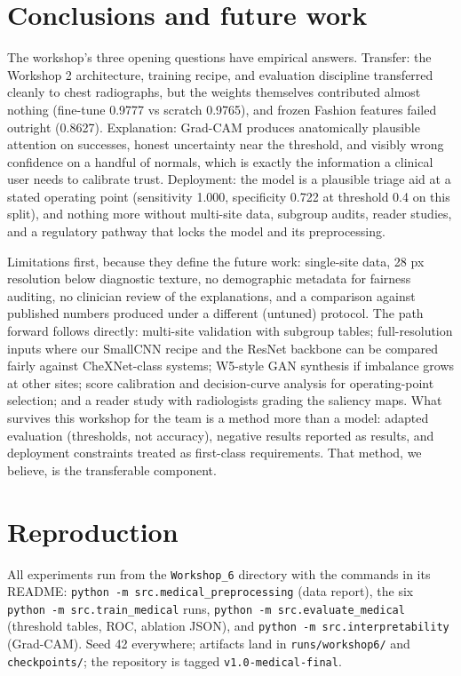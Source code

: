 \documentclass[11pt,a4paper]{article}
\begin{document}
\section{Conclusions and future work}

The workshop's three opening questions have empirical answers. Transfer: the Workshop 2 architecture, training recipe, and evaluation discipline transferred cleanly to chest radiographs, but the weights themselves contributed almost nothing (fine-tune 0.9777 vs scratch 0.9765), and frozen Fashion features failed outright (0.8627). Explanation: Grad-CAM produces anatomically plausible attention on successes, honest uncertainty near the threshold, and visibly wrong confidence on a handful of normals, which is exactly the information a clinical user needs to calibrate trust. Deployment: the model is a plausible triage aid at a stated operating point (sensitivity 1.000, specificity 0.722 at threshold 0.4 on this split), and nothing more without multi-site data, subgroup audits, reader studies, and a regulatory pathway that locks the model and its preprocessing.

Limitations first, because they define the future work: single-site data, 28 px resolution below diagnostic texture, no demographic metadata for fairness auditing, no clinician review of the explanations, and a comparison against published numbers produced under a different (untuned) protocol. The path forward follows directly: multi-site validation with subgroup tables; full-resolution inputs where our SmallCNN recipe and the ResNet backbone can be compared fairly against CheXNet-class systems; W5-style GAN synthesis if imbalance grows at other sites; score calibration and decision-curve analysis for operating-point selection; and a reader study with radiologists grading the saliency maps. What survives this workshop for the team is a method more than a model: adapted evaluation (thresholds, not accuracy), negative results reported as results, and deployment constraints treated as first-class requirements. That method, we believe, is the transferable component.

\section*{Reproduction}

All experiments run from the \texttt{Workshop\_6} directory with the commands in its README: \texttt{python -m src.medical\_preprocessing} (data report), the six \texttt{python -m src.train\_medical} runs, \texttt{python -m src.evaluate\_medical} (threshold tables, ROC, ablation JSON), and \texttt{python -m src.interpretability} (Grad-CAM). Seed 42 everywhere; artifacts land in \texttt{runs/workshop6/} and \texttt{checkpoints/}; the repository is tagged \texttt{v1.0-medical-final}.
\end{document}
